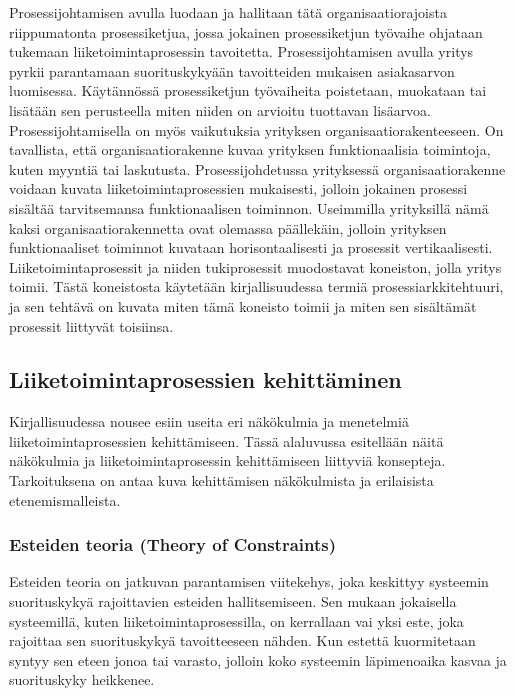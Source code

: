 \documentclass[finnish,12pt,a4paper,pdftex]{article}
\begin{document}
Prosessijohtamisen avulla luodaan ja hallitaan tätä organisaatiorajoista riippumatonta prosessiketjua, jossa jokainen prosessiketjun työvaihe ohjataan tukemaan liiketoimintaprosessin tavoitetta. Prosessijohtamisen avulla yritys pyrkii parantamaan suorituskykyään tavoitteiden mukaisen asiakasarvon luomisessa. Käytännössä prosessiketjun työvaiheita poistetaan, muokataan tai lisätään sen perusteella miten niiden on arvioitu tuottavan lisäarvoa. \citep{ohjelmistotuotanto}\\

Prosessijohtamisella on myös vaikutuksia yrityksen organisaatiorakenteeseen. On tavallista, että organisaatiorakenne kuvaa yrityksen funktionaalisia toimintoja, kuten myyntiä tai laskutusta. Prosessijohdetussa yrityksessä organisaatiorakenne voidaan kuvata liiketoimintaprosessien mukaisesti, jolloin jokainen prosessi sisältää tarvitsemansa funktionaalisen toiminnon. Useimmilla yrityksillä nämä kaksi organisaatiorakennetta ovat olemassa päällekäin, jolloin yrityksen funktionaaliset toiminnot kuvataan horisontaalisesti ja prosessit vertikaalisesti. \citep{vanhatorre}\\

Liiketoimintaprosessit ja niiden tukiprosessit muodostavat koneiston, jolla yritys toimii. Tästä koneistosta käytetään kirjallisuudessa termiä prosessiarkkitehtuuri, ja sen tehtävä on kuvata miten tämä koneisto toimii ja miten sen sisältämät prosessit liittyvät toisiinsa.

\subsection{Liiketoimintaprosessien kehittäminen}

Kirjallisuudessa nousee esiin useita eri näkökulmia ja menetelmiä liiketoimintaprosessien kehittämiseen. Tässä alaluvussa esitellään näitä näkökulmia ja liiketoimintaprosessin kehittämiseen liittyviä konsepteja. Tarkoituksena on antaa kuva kehittämisen näkökulmista ja erilaisista etenemismalleista.

\subsubsection{Esteiden teoria (Theory of Constraints)}

Esteiden teoria on jatkuvan parantamisen viitekehys, joka keskittyy systeemin suorituskykyä rajoittavien esteiden hallitsemiseen. Sen mukaan jokaisella systeemillä, kuten liiketoimintaprosessilla, on kerrallaan vai yksi este, joka rajoittaa sen suorituskykyä tavoitteeseen nähden. Kun estettä kuormitetaan syntyy sen eteen jonoa tai varasto, jolloin koko systeemin läpimenoaika kasvaa ja suorituskyky heikkenee.\\
\end{document}
